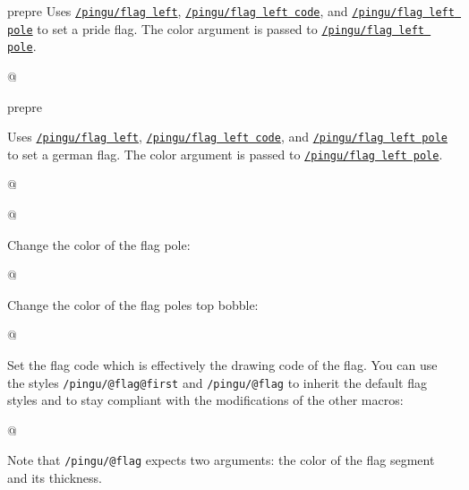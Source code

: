\documentclass[parskip=half,english,numbers=noenddot,footnotes=nomultiple,oneside]{scrartcl}
\makeatletter
\def\lpingu#1{\lstinline[style=lstpingu,language=pingulang]'#1'}
\def\@showcase@pre{pre}
\let\@showcase@cur\@showcase@pre
\def\@toggle@showcase{\ifx\@showcase@cur\@showcase@pre\global\let\@showcase@cur\@empty\else \global\let\@showcase@cur\@showcase@pre\fi}
\newcommand*\keyref[2][/pingu/]{\hyperref[pk:#1#2]{\lpingu{#1#2}}}
\makeatother
\begin{document}
\@toggle@showcase %
	Uses \keyref{flag left}, \keyref{flag left code}, and \keyref{flag left pole} to set a pride flag. The color argument is passed to \keyref{flag left pole}.
\begin{tcblisting}{@}
\begin{tikzpicture}
	\pingu[pride flag left=green]
\end{tikzpicture}
\end{tcblisting}
\endshowkeyexplain
\@toggle@showcase %


	Uses \keyref{flag left}, \keyref{flag left code}, and \keyref{flag left pole} to set a german flag. The color argument is passed to \keyref{flag left pole}.
\begin{tcblisting}{@}
\begin{tikzpicture}
	\pingu[german flag left=green]
\end{tikzpicture}
\end{tcblisting}
\endshowkeyexplain


\begin{tcblisting}{@}
\begin{tikzpicture}
	\pingu[flag right=green]
\end{tikzpicture}
\end{tcblisting}
\endshowkeyexplain

Change the color of the flag pole:
	\begin{tcblisting}{@}
\begin{tikzpicture}
	\pingu[flag right, flag right pole=green]
\end{tikzpicture}
\end{tcblisting}
\endsubkeyexplain

Change the color of the flag poles top bobble:
	\begin{tcblisting}{@}
\begin{tikzpicture}
	\pingu[flag right, flag right bobble=green]
\end{tikzpicture}
\end{tcblisting}
\endsubkeyexplain

Set the flag code which is effectively the drawing code of the flag.
You can use the styles \lpingu{/pingu/@flag@first} and \lpingu{/pingu/@flag} to inherit the default flag styles and to stay compliant with the modifications of the other macros:
	\begin{tcblisting}{@}
\begin{tikzpicture}
	\pingu[flag right, flag right code={
	  \node[/pingu/@flag@first,
	  	/pingu/@flag={blue}{5mm}]
	  		(upper) at (0,0) {};
	  \node[below,/pingu/@flag={black}{4mm}]
	  	(lower) at (upper.south) {};
	}]
\end{tikzpicture}
\end{tcblisting}
Note that \lpingu{/pingu/@flag} expects two arguments: the color of the flag segment and its thickness.
\endsubkeyexplain
\end{document}
